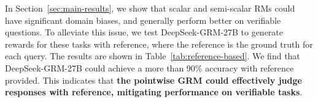 \documentclass{article} %
\newcommand{\SGRM}{DeepSeek-GRM-27B\xspace}
\begin{document}

In Section~\ref{sec:main-results}, we show that scalar and semi-scalar RMs could have significant domain biases, and generally perform better on verifiable questions. To alleviate this issue, we test \SGRM to generate rewards for these tasks with reference, where the reference is the ground truth for each query. 
The results are shown in Table~\ref{tab:reference-based}. We find that \SGRM could achieve a more than 90\% accuracy with reference provided. This indicates that \textbf{the pointwise GRM could effectively judge responses with reference, mitigating performance on verifiable tasks}. 
\end{document}

